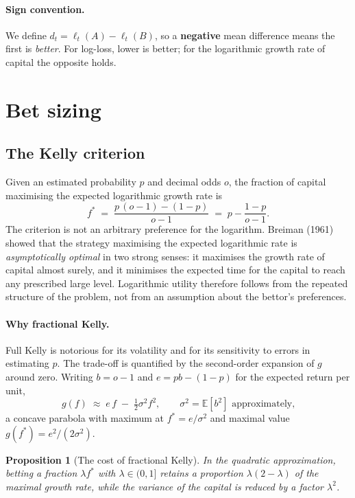 \documentclass[12pt,a4paper,oneside]{report}
\renewcommand{\_}{\oldunderscore\allowbreak}
\theoremstyle{definition}
\theoremstyle{plain}
\newtheorem{proposition}[theorem]{Proposition}
\theoremstyle{remark}
\begin{document}
\paragraph{Sign convention.} We define $d_t = \ell_t(A) - \ell_t(B)$, so a \textbf{negative} mean
difference means the first is \emph{better}. For log-loss, lower is better; for the logarithmic
growth rate of capital the opposite holds.

\section{Bet sizing}

\subsection{The Kelly criterion}
\label{sec:kelly-theory}

Given an estimated probability $p$ and decimal odds $o$, the fraction of capital maximising the
expected logarithmic growth rate is
\[
f^{*} \;=\; \frac{p\,(o-1) - (1-p)}{o-1} \;=\; p - \frac{1-p}{o-1}.
\]
The criterion is not an arbitrary preference for the logarithm. Breiman (1961) showed that the
strategy maximising the expected logarithmic rate is \emph{asymptotically optimal} in two strong
senses: it maximises the growth rate of capital almost surely, and it minimises the expected time
for the capital to reach any prescribed large level. Logarithmic utility therefore follows from
the repeated structure of the problem, not from an assumption about the bettor's preferences.

\paragraph{Why fractional Kelly.} Full Kelly is notorious for its volatility and for its
sensitivity to errors in estimating $p$. The trade-off is quantified by the second-order
expansion of $g$ around zero. Writing $b=o-1$ and $e = pb-(1-p)$ for the expected return per
unit,
\[
g(f) \;\approx\; e\,f \;-\; \tfrac12 \sigma^2 f^2, \qquad \sigma^2 = \mathbb{E}[b^2] \text{ approximately,}
\]
a concave parabola with maximum at $f^{*}=e/\sigma^2$ and maximal value
$g(f^{*}) = e^2/(2\sigma^2)$.

\begin{proposition}[The cost of fractional Kelly]
\label{prop:fractional-kelly}
In the quadratic approximation, betting a fraction $\lambda f^{*}$ with $\lambda\in(0,1]$ retains
a proportion $\lambda(2-\lambda)$ of the maximal growth rate, while the variance of the capital
is reduced by a factor $\lambda^2$.
\end{proposition}
\end{document}
